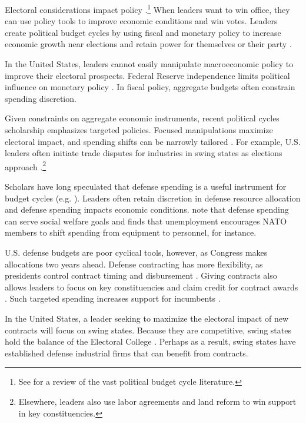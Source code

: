 \documentclass[12pt]{article}
\begin{document}
Electoral considerations impact policy \citep{Nordhaus1975}.\footnote{See \citet{Dubois2016} for a review of the vast political budget cycle literature.} 
When leaders want to win office, they can use policy tools to improve economic conditions and win votes. 
Leaders create political budget cycles by using fiscal and monetary policy to increase economic growth near elections and retain power for themselves or their party \citep{Tufte1978, Rogoff1987}. 


In the United States, leaders cannot easily manipulate macroeconomic policy to improve their electoral prospects.  
Federal Reserve independence limits political influence on monetary policy \citep{ClarkHallerberg2000}. 
In fiscal policy, aggregate budgets often constrain spending discretion.


Given constraints on aggregate economic instruments, recent political cycles scholarship emphasizes targeted policies.
Focused manipulations maximize electoral impact, and spending shifts can be narrowly tailored \citep[pg. 248]{Dubois2016}.
For example, U.S. leaders often initiate trade disputes for industries in swing states as elections approach \citep{Conconietal2017}.\footnote{Elsewhere, leaders also use labor agreements \citep{Ahlquist2010} and land reform \citep{Philips2020} to win support in key constituencies.} 


Scholars have long speculated that defense spending is a useful instrument for budget cycles (e.g. \cite{Tufte1978, Mintz1988}).
Leaders often retain discretion in defense resource allocation and defense spending impacts economic conditions.
\citet{WhittenWilliams2011} note that defense spending can serve social welfare goals and \citet{Becker2021} finds that unemployment encourages NATO members to shift spending from equipment to personnel, for instance.


U.S. defense budgets are poor cyclical tools, however, as Congress makes allocations two years ahead.
Defense contracting has more flexibility, as presidents control contract timing and disbursement \citep{Mayer1995, DerouenHeo2000}.
Giving contracts also allows leaders to focus on key constituencies and claim credit for contract awards \citep{DerouenHeo2000}. 
Such targeted spending increases support for incumbents \citep{KrinerReeves2012}.


In the United States, a leader seeking to maximize the electoral impact of new contracts will focus on swing states.
Because they are competitive, swing states hold the balance of the Electoral College \citep{KrinerReeves2015}. 
Perhaps as a result, swing states have established defense industrial firms that can benefit from contracts. 
\end{document}
